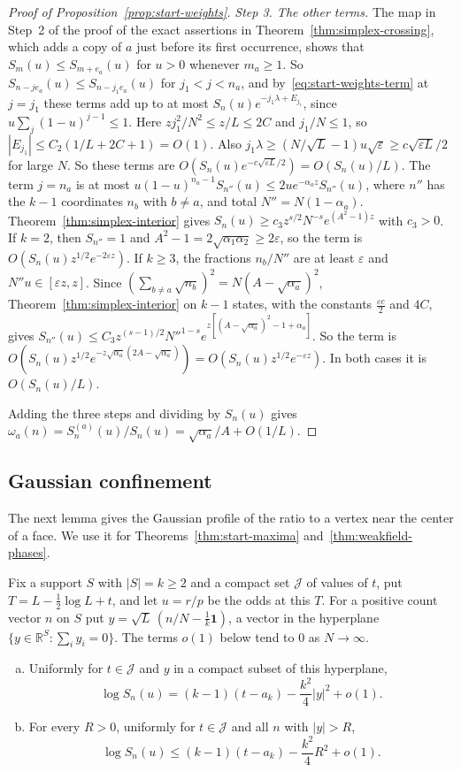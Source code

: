 \begin{proof}[Proof of Proposition~\ref{prop:start-weights}]
\emph{Step 3. The other terms.} The map in Step~2 of the proof of the exact
assertions in Theorem~\ref{thm:simplex-crossing}, which adds a copy of $a$ just
before its first occurrence, shows that $S_m(u)\le S_{m+e_a}(u)$ for $u>0$
whenever $m_a\ge1$. So $S_{n-je_a}(u)\le S_{n-j_1e_a}(u)$ for $j_1<j<n_a$, and
by~\eqref{eq:start-weights-term} at $j=j_1$ these terms add up to at most
$S_n(u)e^{-j_1\lambda+E_{j_1}}$, since $u\sum_j(1-u)^{j-1}\le1$. Here
$zj_1^2/N^2\le z/L\le2C$ and $j_1/N\le1$, so $|E_{j_1}|\le C_2(1/L+2C+1)=O(1)$.
Also $j_1\lambda\ge(N/\sqrt L-1)u\sqrt\varepsilon\ge c\sqrt{\varepsilon L}/2$
for large $N$. So these terms are $O(S_n(u)e^{-c\sqrt{\varepsilon L}/2})
=O(S_n(u)/L)$. The term $j=n_a$ is at most
$u(1-u)^{n_a-1}S_{n''}(u)\le2ue^{-\alpha_az}S_{n''}(u)$, where $n''$ has the
$k-1$ coordinates $n_b$ with $b\ne a$, and total $N''=N(1-\alpha_a)$.
Theorem~\ref{thm:simplex-interior} gives
$S_n(u)\ge c_3z^{s/2}N^{-s}e^{(A^2-1)z}$ with $c_3>0$. If $k=2$, then
$S_{n''}=1$ and $A^2-1=2\sqrt{\alpha_1\alpha_2}\ge2\varepsilon$, so the term is
$O(S_n(u)z^{1/2}e^{-2\varepsilon z})$. If $k\ge3$, the fractions $n_b/N''$ are at
least $\varepsilon$ and $N''u\in[\varepsilon z,z]$. Since
$(\sum_{b\ne a}\sqrt{n_b})^2=N(A-\sqrt{\alpha_a})^2$,
Theorem~\ref{thm:simplex-interior} on $k-1$ states, with the constants
$\frac{\varepsilon c}2$ and $4C$, gives
$S_{n''}(u)\le C_3z^{(s-1)/2}N''^{1-s}e^{z[(A-\sqrt{\alpha_a})^2-1+\alpha_a]}$.
So the term is
$O(S_n(u)z^{1/2}e^{-z\sqrt{\alpha_a}(2A-\sqrt{\alpha_a})})
=O(S_n(u)z^{1/2}e^{-\varepsilon z})$. In both cases it is $O(S_n(u)/L)$.

Adding the three steps and dividing by $S_n(u)$ gives
$\omega_a(n)=S^{(a)}_n(u)/S_n(u)=\sqrt{\alpha_a}/A+O(1/L)$.
\end{proof}

\subsection{Gaussian confinement}

The next lemma gives the Gaussian profile of the ratio to a vertex near the
center of a face. We use it for Theorems~\ref{thm:start-maxima} and~\ref{thm:weakfield-phases}.

\begin{lemma}\label{lem:confinement}
Fix a support $S$ with $|S|=k\ge2$ and a compact set $\mathcal J$ of values of
$t$, put $T=L-\frac12\log L+t$, and let $u=r/p$ be the odds at this $T$. For a
positive count vector $n$ on $S$ put $y=\sqrt L\,(n/N-\frac1k\mathbf1)$, a
vector in the hyperplane $\{y\in\mathbb R^S:\sum_iy_i=0\}$. The terms $o(1)$
below tend to $0$ as $N\to\infty$.
\begin{enumerate}[(a)]
\item Uniformly for $t\in\mathcal J$ and $y$ in a compact subset of this
hyperplane,
\[
 \log S_n(u)=(k-1)(t-a_k)-\frac{k^2}4|y|^2+o(1).
\]
\item For every $R>0$, uniformly for $t\in\mathcal J$ and all $n$ with $|y|>R$,
\[
 \log S_n(u)\le(k-1)(t-a_k)-\frac{k^2}4R^2+o(1).
\]
\end{enumerate}
\end{lemma}

